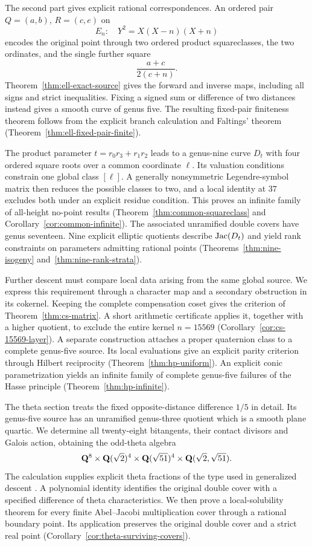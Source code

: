 The second part gives explicit rational correspondences. An ordered pair
$Q=(a,b)$, $R=(c,e)$ on
\[
 E_n:\quad Y^2=X(X-n)(X+n)
\]
encodes the original point through two ordered product squareclasses,
the two ordinates, and the single further square
\[
 \frac{a+c}{2(c+n)}.
\]
Theorem~\ref{thm:ell-exact-source} gives the forward and inverse maps,
including all signs and strict inequalities. Fixing a signed sum or
difference of two distances instead gives a smooth curve of genus five.
The resulting fixed-pair finiteness theorem follows from the explicit
branch calculation and Faltings' theorem
(Theorem~\ref{thm:ell-fixed-pair-finite}).

The product parameter $t=r_0r_3+r_1r_2$ leads to a genus-nine curve $D_t$
with four ordered square roots over a common coordinate $\ell$. Its
valuation conditions constrain one global class $[\ell]$. A generally
nonsymmetric Legendre-symbol matrix then reduces the possible classes to
two, and a local identity at $37$ excludes both under an explicit residue
condition. This proves an infinite family of all-height no-point results
(Theorem~\ref{thm:common-squareclass} and
Corollary~\ref{cor:common-infinite}). The associated unramified double
covers have genus seventeen. Nine explicit elliptic quotients describe
$\operatorname{Jac}(D_t)$ and yield rank constraints on parameters admitting rational
points (Theorems~\ref{thm:nine-isogeny}
and~\ref{thm:nine-rank-strata}).

Further descent must compare local data arising from the same global
source. We express this requirement through a character map and a
secondary obstruction in its cokernel. Keeping the complete compensation
coset gives the criterion of Theorem~\ref{thm:cs-matrix}. A short
arithmetic certificate applies it, together with a higher quotient, to
exclude the entire kernel $n=15569$
(Corollary~\ref{cor:cs-15569-layer}). A separate construction attaches
a proper quaternion class to a complete genus-five source. Its local
evaluations give an explicit parity criterion through Hilbert reciprocity
(Theorem~\ref{thm:hp-uniform}). An explicit conic parametrization yields
an infinite family of complete genus-five failures of the Hasse principle
(Theorem~\ref{thm:hp-infinite}).

The theta section treats the fixed opposite-distance difference $1/5$
in detail. Its genus-five source has an unramified genus-three quotient
which is a smooth plane quartic. We determine all twenty-eight
bitangents, their contact divisors and Galois action, obtaining the
odd-theta algebra
\[
 \mathbf Q^8\times\mathbf Q(\sqrt2)^4\times\mathbf Q(\sqrt{51})^4
 \times\mathbf Q(\sqrt2,\sqrt{51}).
\]
The calculation supplies explicit theta fractions of the type used in
generalized descent \cite{bruinpoonenstoll2016,misme2026}. A polynomial
identity identifies the original double cover with a specified difference
of theta characteristics. We then prove a local-solubility theorem for
every finite Abel--Jacobi multiplication cover through a rational boundary
point. Its application preserves the original double cover and a strict
real point (Corollary~\ref{cor:theta-surviving-covers}).


